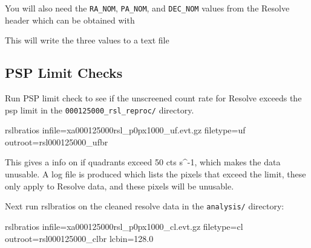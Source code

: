 \documentclass[
  letterpaper,
  DIV=11,
  numbers=noendperiod]{scrreprt}
\newenvironment{Shaded}{\begin{snugshade}}{\end{snugshade}}
\newcommand{\AttributeTok}[1]{\textcolor[rgb]{0.40,0.45,0.13}{#1}}
\newcommand{\CommentTok}[1]{\textcolor[rgb]{0.37,0.37,0.37}{#1}}
\newcommand{\ExtensionTok}[1]{\textcolor[rgb]{0.00,0.23,0.31}{#1}}
\newcommand{\FunctionTok}[1]{\textcolor[rgb]{0.28,0.35,0.67}{#1}}
\newcommand{\KeywordTok}[1]{\textcolor[rgb]{0.00,0.23,0.31}{\textbf{#1}}}
\newcommand{\NormalTok}[1]{\textcolor[rgb]{0.00,0.23,0.31}{#1}}
\newcommand{\OperatorTok}[1]{\textcolor[rgb]{0.37,0.37,0.37}{#1}}
\newcommand{\StringTok}[1]{\textcolor[rgb]{0.13,0.47,0.30}{#1}}
\newcommand{\VariableTok}[1]{\textcolor[rgb]{0.07,0.07,0.07}{#1}}
\begin{document}
You will also need the \texttt{RA\_NOM}, \texttt{PA\_NOM}, and
\texttt{DEC\_NOM} values from the Resolve header which can be obtained
with

\begin{Shaded}
\end{Shaded}

This will write the three values to a text file

\subsection{PSP Limit Checks}\label{psp-limit-checks}

Run PSP limit check to see if the unscreened count rate for Resolve
exceeds the psp limit in the \texttt{000125000\_rsl\_reproc/} directory.

\begin{Shaded}
\begin{Highlighting}[]
\ExtensionTok{rslbratios}\NormalTok{ infile=xa000125000rsl\_p0px1000\_uf.evt.gz filetype=uf outroot=rsl000125000\_ufbr}
\end{Highlighting}
\end{Shaded}

This gives a info on if quadrants exceed 50 cts s\^{}-1, which makes the
data unusable. A log file is produced which lists the pixels that exceed
the limit, these only apply to Resolve data, and these pixels will be
unusable.

Next run rslbratios on the cleaned resolve data in the
\texttt{analysis/} directory:

\begin{Shaded}
\begin{Highlighting}[]
\ExtensionTok{rslbratios}\NormalTok{ infile=xa000125000rsl\_p0px1000\_cl.evt.gz filetype=cl outroot=rsl000125000\_clbr lcbin=128.0}
\end{Highlighting}
\end{Shaded}
\end{document}
